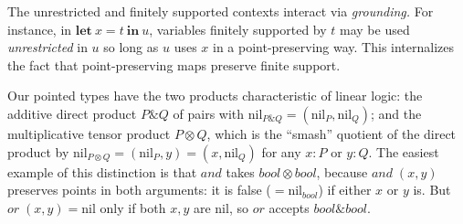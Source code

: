\documentclass[sigplan,screen,dvipsnames,fleqn]{acmart}
\newcommand{\todo}[1]{{\color{ACMRed}#1}}
\newcommand\name[1]{\ensuremath{\mathit{#1}}}
\newcommand\<\;                 %
\newcommand\lto\multimap        %
\newcommand\fto{\rightarrow}    %
\newcommand\with{\mathbin{\&}}
\newcommand\ox\otimes
\newcommand\tbool{\name{bool}}
\newcommand\tmaybe[1]{\ensuremath{{#1}_{*}}}
\renewcommand\tmaybe[1]{\ensuremath{\name{maybe}~{#1}}}
\newcommand\cname\text          %
\newcommand\cnil{\cname{nil}}
\newcommand\tnil\cnil
\newcommand\letin[2]{\textbf{let}~{#1}~\textbf{in}~{#2}}
\newcommand\leteq[3]{\letin{{#1} = {#2}}{#3}}
\begin{document}
The unrestricted and finitely supported contexts interact via \emph{grounding.} For instance, in $\leteq x t u$, variables finitely supported by $t$ may be used \emph{unrestricted} in $u$ so long as $u$ uses $x$ in a point-preserving way.
This internalizes the fact that point-preserving maps preserve finite support.

Our pointed types have the two products characteristic of linear logic: the additive direct product $P \with Q$ of pairs with $\tnil_{P \with Q} = (\tnil_P, \tnil_Q)$; and the multiplicative tensor product $P \otimes Q$, which is the ``smash'' quotient of the direct product by $\tnil_{P \otimes Q} = (\tnil_P, y) = (x, \tnil_Q)$ for any $x : P$ or $y : Q$.
The easiest example of this distinction is that \name{and} takes $\tbool \ox \tbool$, because $\name{and} \<(x,y)$ preserves points in both arguments: it is false ($= \tnil_\tbool$) if either $x$ or $y$ is. But $\name{or} \<(x,y) = \tnil$ only if both $x,y$ are $\tnil$, so $\name{or}$ accepts $\tbool \with \tbool$.









\end{document}
